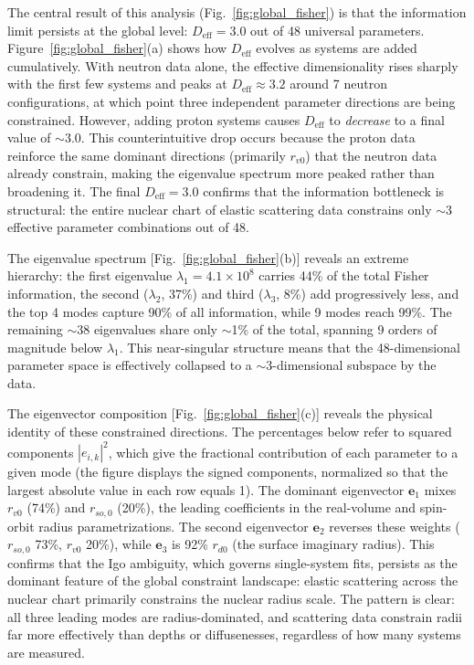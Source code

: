 \documentclass[aps,prl,reprint,superscriptaddress,showpacs]{revtex4-2}
\begin{document}
The central result of this analysis (Fig.~\ref{fig:global_fisher}) is that the information limit persists at the global level: $D_\mathrm{eff} = 3.0$ out of 48 universal parameters. Figure~\ref{fig:global_fisher}(a) shows how $D_\mathrm{eff}$ evolves as systems are added cumulatively. With neutron data alone, the effective dimensionality rises sharply with the first few systems and peaks at $D_\mathrm{eff} \approx 3.2$ around 7 neutron configurations, at which point three independent parameter directions are being constrained. However, adding proton systems causes $D_\mathrm{eff}$ to \emph{decrease} to a final value of $\sim$3.0. This counterintuitive drop occurs because the proton data reinforce the same dominant directions (primarily $r_{v0}$) that the neutron data already constrain, making the eigenvalue spectrum more peaked rather than broadening it. The final $D_\mathrm{eff} = 3.0$ confirms that the information bottleneck is structural: the entire nuclear chart of elastic scattering data constrains only $\sim$3 effective parameter combinations out of 48.

The eigenvalue spectrum [Fig.~\ref{fig:global_fisher}(b)] reveals an extreme hierarchy: the first eigenvalue $\lambda_1 = 4.1 \times 10^8$ carries 44\% of the total Fisher information, the second ($\lambda_2$, 37\%) and third ($\lambda_3$, 8\%) add progressively less, and the top 4 modes capture 90\% of all information, while 9 modes reach 99\%. The remaining $\sim$38 eigenvalues share only $\sim$1\% of the total, spanning 9 orders of magnitude below $\lambda_1$. This near-singular structure means that the 48-dimensional parameter space is effectively collapsed to a $\sim$3-dimensional subspace by the data.

The eigenvector composition [Fig.~\ref{fig:global_fisher}(c)] reveals the physical identity of these constrained directions. The percentages below refer to squared components $|e_{i,k}|^2$, which give the fractional contribution of each parameter to a given mode (the figure displays the signed components, normalized so that the largest absolute value in each row equals 1). The dominant eigenvector $\mathbf{e}_1$ mixes $r_{v0}$ (74\%) and $r_{so,0}$ (20\%), the leading coefficients in the real-volume and spin-orbit radius parametrizations. The second eigenvector $\mathbf{e}_2$ reverses these weights ($r_{so,0}$ 73\%, $r_{v0}$ 20\%), while $\mathbf{e}_3$ is 92\% $r_{d0}$ (the surface imaginary radius). This confirms that the Igo ambiguity, which governs single-system fits, persists as the dominant feature of the global constraint landscape: elastic scattering across the nuclear chart primarily constrains the nuclear radius scale. The pattern is clear: all three leading modes are radius-dominated, and scattering data constrain radii far more effectively than depths or diffusenesses, regardless of how many systems are measured.
\end{document}
